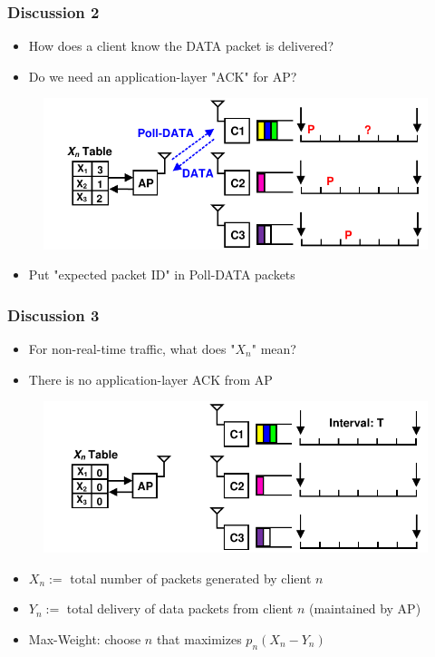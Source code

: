 \documentclass{beamer}
\begin{document}
\begin{frame}
\frametitle{Discussion 2}
\begin{itemize}
\item How does a client know the DATA packet is delivered?
\item Do we need an application-layer "ACK" for AP? 
\end{itemize}
\begin{figure}
\centering
\includegraphics[scale=0.8]{discussion_2.pdf}
\end{figure}
\begin{itemize}
\pause
\item Put "expected packet ID" in Poll-DATA packets
\end{itemize}
\end{frame}

\begin{frame}
\frametitle{Discussion 3}
\begin{itemize}
\item For non-real-time traffic, what does "$X_n$" mean? 
\item There is no application-layer ACK from AP
\end{itemize}
\begin{figure}
\centering
\includegraphics[scale=0.65]{discussion_3.pdf}
\end{figure}
\pause
\begin{itemize}
\item $X_n:=$ total number of packets generated by client $n$
\item $Y_n:=$ total delivery of data packets from client $n$ (maintained by AP)
\item Max-Weight: choose $n$ that maximizes $p_n(X_n-Y_n)$
\end{itemize}
\end{frame}
\end{document}
